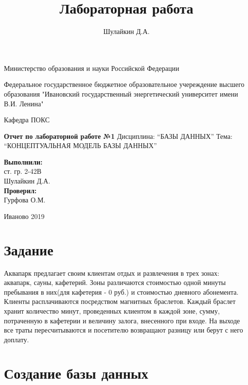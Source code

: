 \documentclass[a4paper]{article}
\title{Лабораторная работа}
\author{Шулайкин Д.А.}
\begin{document}
\onehalfspacing
\thispagestyle{empty}

\begin{center}
Министерство образования и науки Российской Федерации
\vspace{10pt}

Федеральное государственное бюджетное образовательное учереждение высшего образования "Ивановский государственный энергетический университет имени В.И. Ленина"
\vspace{40pt}

Кафедра ПОКС
\vspace{40pt}

\textbf{Отчет по лабораторной работе №1}
Дисциплина: ``БАЗЫ ДАННЫХ''
Тема: ``КОНЦЕПТУАЛЬНАЯ МОДЕЛЬ БАЗЫ ДАННЫХ''
\end{center}

\vspace{330pt}

\begin{flushright}
\textbf{Выполнили:} \\
ст. гр. 2-42В \\
Шулайкин Д.А. \\

\textbf{Проверил:} \\
Гурфова О.М.
\end{flushright}

\vspace{40pt}

\begin{center}
	Иваново 2019
\end{center}

\pagebreak

\section{Задание}
Аквапарк предлагает своим клиентам отдых и развлечения в трех зонах: аквапарк, сауны, кафетерий.
Зоны различаются стоимостью одной минуты пребывания в них(для кафетерия - 0 руб.) и стоимостью дневного абонемента.
Клиенты расплачиваются посредством магнитных браслетов. 
Каждый браслет хранит количество минут, проведенных клиентом в каждой зоне, сумму, 
потраченную в кафетерии и величину залога, внесенного при входе.
На выходе все траты пересчитываются и посетителю возвращают разницу или берут с него доплату.

\section{Создание базы данных}
\end{document}
